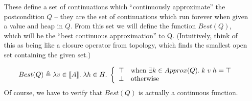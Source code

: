 These define a set of continuations which ``continuously approximate''
the postcondition $Q$ -- they are the set of continuations which run
forever when given a value and heap in $Q$.  From this set we will
define the function $Best(Q)$, which will be the ``best continuous
approximation'' to Q. (Intuitively, think of this as being like a
closure operator from topology, which finds the smallest open set
containing the given set.)

\begin{displaymath}
  Best(Q) \triangleq \lambda v \in [\![{A}]\!].\; \lambda h \in H.\; 
    \left\{\begin{array}{ll}
             \top & \mbox{when } \exists k \in Approx(Q).\; k\;v\;h = \top \\
             \bot & \mbox{otherwise}
           \end{array}
    \right.
\end{displaymath}
Of course, we have to verify that $Best(Q)$ is actually a continuous function. 

